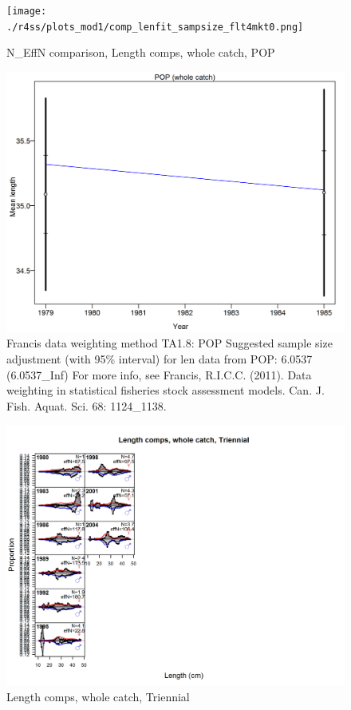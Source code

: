 \documentclass[12pt,]{article}
\begin{document}
\begin{figure}
\centering
\texttt{[image: ./r4ss/plots\_mod1/comp\_lenfit\_sampsize\_flt4mkt0.png]}
\caption{N\_EffN comparison, Length comps, whole catch, POP
\label{fig:mod1_16_comp_lenfit_sampsize_flt4mkt0}}
\end{figure}

\begin{figure}
\centering
\includegraphics{./r4ss/plots_mod1/comp_lenfit_data_weighting_TA1.8_POP.png}
\caption{Francis data weighting method TA1.8: POP Suggested sample size
adjustment (with 95\% interval) for len data from POP: 6.0537
(6.0537\_Inf) For more info, see Francis, R.I.C.C. (2011). Data
weighting in statistical fisheries stock assessment models. Can. J.
Fish. Aquat. Sci. 68: 1124\_1138.
\label{fig:mod1_17_comp_lenfit_data_weighting_TA1.8_POP}}
\end{figure}

\begin{figure}
\centering
\includegraphics{./r4ss/plots_mod1/comp_lenfit_flt5mkt0.png}
\caption{Length comps, whole catch, Triennial
\label{fig:mod1_18_comp_lenfit_flt5mkt0}}
\end{figure}
\end{document}

